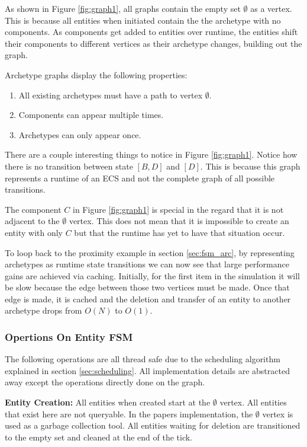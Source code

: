 As shown in Figure \ref{fig:graph1}, all graphs contain the empty set $\emptyset$ as a vertex. This is because all entities when initiated contain the the archetype with no components. As components get added to entities over runtime, the entities shift their components to different vertices as their archetype changes, building out the graph.

Archetype graphs display the following properties:

\begin{enumerate}
    \item All existing archetypes must have a path to vertex $\emptyset$.
    \item Components can appear multiple times.
    \item Archetypes can only appear once.
\end{enumerate}

There are a couple interesting things to notice in Figure \ref{fig:graph1}. Notice how there is no transition between state $[B,D]$ and $[D]$. This is because this graph represents a runtime of an ECS and not the complete graph of all possible transitions. 

The component $C$ in Figure \ref{fig:graph1} is special in the regard that it is not adjacent to the $\emptyset$ vertex. This does not mean that it is impossible to create an entity with only $C$ but that the runtime has yet to have that situation occur.

To loop back to the proximity example in section \ref{sec:fsm_arc}, by representing archetypes as runtime state transitions we can now see that large performance gains are achieved via caching. Initially, for the first item in the simulation it will be slow because the edge between those two vertices must be made. Once that edge is made, it is cached and the deletion and transfer of an entity to another archetype drops from $O(N)$ to $O(1)$.

\subsubsection{Opertions On Entity FSM}
The following operations are all thread safe due to the scheduling algorithm explained in section \ref{sec:scheduling}. All implementation details are abstracted away except the operations directly done on the graph. 

\textbf{Entity Creation:} All entities when created start at the $\emptyset$ vertex. All entities that exist here are not queryable. In the papers implementation, the $\emptyset$ vertex is used as a garbage collection tool. All entities waiting for deletion are transitioned to the empty set and cleaned at the end of the tick. 

